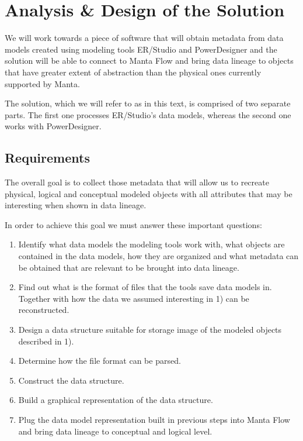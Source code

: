 \chapter{Analysis \& Design of the Solution}

We will work towards a piece of software that will obtain metadata from data models created using modeling tools ER/Studio and PowerDesigner and the solution will be able to connect to Manta Flow and bring data lineage to objects that have greater extent of abstraction than the physical ones currently supported by Manta.

The solution, which we will refer to as  in this text, is comprised of two separate parts. The first one processes ER/Studio's data models, whereas the second one works with PowerDesigner.

\section{Requirements}

The overall goal is to collect those metadata that will allow us to recreate physical, logical and conceptual modeled objects with all attributes that may be interesting when shown in data lineage.

In order to achieve this goal we must answer these important questions:

\begin{enumerate}
	\item Identify what data models the modeling tools work with, what objects are contained in the data models, how they are organized and what metadata can be obtained that are relevant to be brought into data lineage. 
	\item Find out what is the format of files that the tools save data models in. Together with how the data we assumed interesting in 1) can be reconstructed. 
	\item Design a data structure suitable for storage image of the modeled objects described in 1). 
	\item Determine how the file format can be parsed. 
	\item Construct the data structure. 
	\item Build a graphical representation of the data structure. 
	\item Plug the data model representation built in previous steps into Manta Flow and bring data lineage to conceptual and logical level. 
\end{enumerate}

